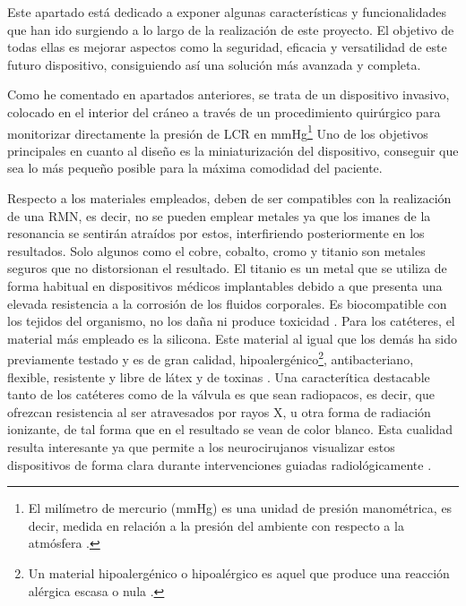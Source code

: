 
Este apartado está dedicado a exponer algunas características y funcionalidades que han ido surgiendo a lo largo de la realización de este proyecto. El objetivo de todas ellas es mejorar aspectos como la seguridad, eficacia y versatilidad de este futuro dispositivo, consiguiendo así una solución más avanzada y completa.

Como he comentado en apartados anteriores, se trata de un dispositivo invasivo, colocado en el interior del cráneo a través de un procedimiento quirúrgico para monitorizar directamente la presión de LCR en mmHg\footnote{El milímetro de mercurio (mmHg) es una unidad de presión manométrica, es decir, medida en relación a la presión del ambiente con respecto a la atmósfera \cite{presion}.} Uno de los objetivos principales en cuanto al diseño es la miniaturización del dispositivo, conseguir que sea lo más pequeño posible para la máxima comodidad del paciente.

Respecto a los materiales empleados, deben de ser compatibles con la realización de una RMN, es decir, no se pueden emplear metales ya que los imanes de la resonancia se sentirán atraídos por estos, interfiriendo posteriormente en los resultados. Solo algunos como el cobre, cobalto, cromo y titanio son metales seguros que no distorsionan el resultado. El titanio es un metal que se utiliza de forma habitual en dispositivos médicos implantables debido a que presenta una elevada resistencia a la corrosión de los fluidos corporales. Es biocompatible con los tejidos del organismo, no los daña ni produce toxicidad \cite{titanio}. Para los catéteres, el material más empleado es la silicona. Este material al igual que los demás ha sido previamente testado y es de gran calidad, hipoalergénico\footnote{Un material hipoalergénico o hipoalérgico es aquel que produce una reacción alérgica escasa o nula \cite{hipoalergenico}.}, antibacteriano, flexible, resistente y libre de látex y de toxinas \cite{silicona}. Una caracterítica destacable tanto de los catéteres como de la válvula es que sean radiopacos, es decir, que ofrezcan resistencia al ser atravesados por rayos X, u otra forma de radiación ionizante, de tal forma que en el resultado se vean de color blanco. Esta cualidad resulta interesante ya que permite a los neurocirujanos visualizar estos dispositivos de forma clara durante intervenciones guiadas radiológicamente \cite{radiopaco}.

